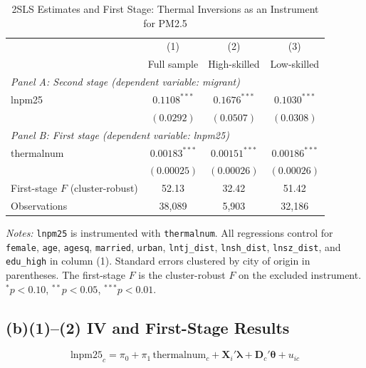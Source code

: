 \documentclass[11pt]{article}
\begin{document}
\begin{table}[H]
\centering
\begin{threeparttable}
\caption{2SLS Estimates and First Stage: Thermal Inversions as an Instrument for PM2.5}
\label{tab:iv}
\small
\begin{tabular}{lccc}
\toprule
 & (1) & (2) & (3) \\
 & Full sample & High-skilled & Low-skilled \\
\midrule
\multicolumn{4}{l}{\textit{Panel A: Second stage (dependent variable: migrant)}} \\
lnpm25 & $0.1108^{***}$ & $0.1676^{***}$ & $0.1030^{***}$ \\
 & $(0.0292)$ & $(0.0507)$ & $(0.0308)$ \\
\midrule
\multicolumn{4}{l}{\textit{Panel B: First stage (dependent variable: lnpm25)}} \\
thermalnum & $0.00183^{***}$ & $0.00151^{***}$ & $0.00186^{***}$ \\
 & $(0.00025)$ & $(0.00026)$ & $(0.00026)$ \\
First-stage $F$ (cluster-robust) & 52.13 & 32.42 & 51.42 \\
\midrule
Observations & 38,089 & 5,903 & 32,186 \\
\bottomrule
\end{tabular}
\begin{tablenotes}\footnotesize
\item \textit{Notes:} \texttt{lnpm25} is instrumented with \texttt{thermalnum}. All regressions control for \texttt{female}, \texttt{age}, \texttt{agesq}, \texttt{married}, \texttt{urban}, \texttt{lntj\_dist}, \texttt{lnsh\_dist}, \texttt{lnsz\_dist}, and \texttt{edu\_high} in column (1). Standard errors clustered by city of origin in parentheses. The first-stage $F$ is the cluster-robust $F$ on the excluded instrument. $^{*}p<0.10$, $^{**}p<0.05$, $^{***}p<0.01$.
\end{tablenotes}
\end{threeparttable}
\end{table}

\subsection*{(b)(1)--(2) IV and First-Stage Results}
\begin{equation}
\label{eq:ols}
\text{lnpm25}_c = \pi_0 + \pi_1 \,\text{thermalnum}_c + \mathbf{X}_i'\boldsymbol{\lambda} + \mathbf{D}_c'\boldsymbol{\theta} + u_{ic}
\end{equation}
\end{document}
